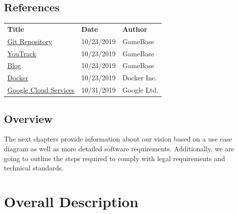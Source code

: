 \documentclass[a4paper,12pt,chapterprefix=false,bibliography=totoc,listof=totoc,]{scrreprt}
\begin{document}
\section{References}
\begin{table}[H]
	\centering
	\everyrow{\hline}
	\begin{tabu} to \textwidth {|X[c]|X[c]|X[c]|}
		\textbf{Title} & \textbf{Date} & \textbf{Author} \\
		\href{https://gitlab.tandashi.de/GameBase}{Git Repository} & 10/23/2019 & GameBase \\
		\href{https://youtrack.gahr.dev}{YouTrack} & 10/23/2019 & GameBase \\
		\href{https://gahr.dev}{Blog} & 10/23/2019 & GameBase \\
		\href{https://www.docker.com/}{Docker} & 10/23/2019 & Docker Inc. \\
		\href{https://cloud.google.com/}{Google Cloud Services} & 10/31/2019 & Google Ltd. \\
	\end{tabu}
	\label{tab:references-tabview}
\end{table}

\section{Overview}
The next chapters provide information about our vision based on a use case diagram as well as more detailed software requirements. Additionally, we are going to outline the steps required to comply with legal requirements and technical standards.

\chapter{Overall Description}
\end{document}

